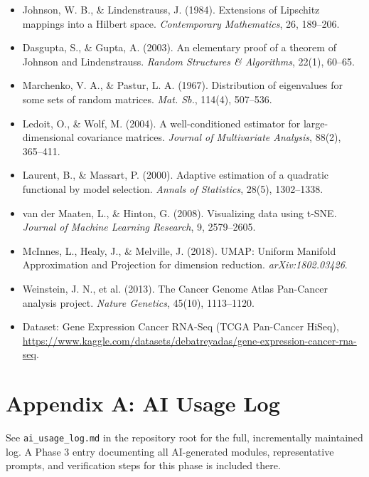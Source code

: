\documentclass[11pt]{article}
\begin{document}
\begin{itemize}
\item Johnson, W. B., \& Lindenstrauss, J. (1984). Extensions of Lipschitz
mappings into a Hilbert space. \emph{Contemporary Mathematics}, 26, 189--206.
\item Dasgupta, S., \& Gupta, A. (2003). An elementary proof of a theorem
of Johnson and Lindenstrauss. \emph{Random Structures \& Algorithms},
22(1), 60--65.
\item Marchenko, V. A., \& Pastur, L. A. (1967). Distribution of
eigenvalues for some sets of random matrices. \emph{Mat. Sb.}, 114(4), 507--536.
\item Ledoit, O., \& Wolf, M. (2004). A well-conditioned estimator for
large-dimensional covariance matrices. \emph{Journal of Multivariate
Analysis}, 88(2), 365--411.
\item Laurent, B., \& Massart, P. (2000). Adaptive estimation of a
quadratic functional by model selection. \emph{Annals of Statistics},
28(5), 1302--1338.
\item van der Maaten, L., \& Hinton, G. (2008). Visualizing data using
t-SNE. \emph{Journal of Machine Learning Research}, 9, 2579--2605.
\item McInnes, L., Healy, J., \& Melville, J. (2018). UMAP: Uniform
Manifold Approximation and Projection for dimension reduction.
\emph{arXiv:1802.03426}.
\item Weinstein, J. N., et al. (2013). The Cancer Genome Atlas Pan-Cancer
analysis project. \emph{Nature Genetics}, 45(10), 1113--1120.
\item Dataset: Gene Expression Cancer RNA-Seq (TCGA Pan-Cancer HiSeq),
\url{https://www.kaggle.com/datasets/debatreyadas/gene-expression-cancer-rna-seq}.
\end{itemize}

\appendix
\section{Appendix A: AI Usage Log}
See \texttt{ai\_usage\_log.md} in the repository root for the full,
incrementally maintained log. A Phase 3 entry documenting all
AI-generated modules, representative prompts, and verification steps for
this phase is included there.
\end{document}
